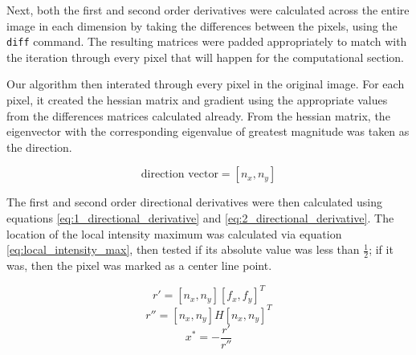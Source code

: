 \documentclass{article}
\begin{document}
Next, both the first and second order derivatives were calculated across the entire image in each dimension by taking the differences between the pixels, using the \texttt{diff} command. The resulting matrices were padded appropriately to match with the iteration through every pixel that will happen for the computational section.

Our algorithm then interated through every pixel in the original image. For each pixel, it created the hessian matrix and gradient using the appropriate values from the differences matrices calculated already. From the hessian matrix, the eigenvector with the corresponding eigenvalue of greatest magnitude was taken as the direction.

\begin{equation}
\text{direction vector} = [n_x, n_y]
\label{eq:direction}
\end{equation}

The first and second order directional derivatives were then calculated using equations \ref{eq:1_directional_derivative} and \ref{eq:2_directional_derivative}. The location of the local intensity maximum was calculated via equation \ref{eq:local_intensity_max}, then tested if its absolute value was less than $\frac{1}{2}$; if it was, then the pixel was marked as a center line point.

\begin{equation}
r' = [n_x,n_y][f_x,f_y]^T
\label{eq:1_directional_derivative}
\end{equation}
\begin{equation}
r'' = [n_x,n_y]H[n_x,n_y]^T
\label{eq:2_directional_derivative}
\end{equation}
\begin{equation}
x^* = -\frac{r'}{r''}
\label{eq:local_intensity_max}
\end{equation}
\end{document}
